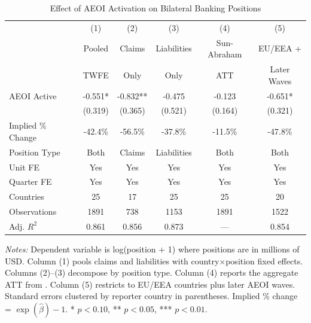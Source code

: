 \begin{table}[t]
\centering
\caption{Effect of AEOI Activation on Bilateral Banking Positions}
\label{tab:main}
\begin{tabular}{lccccc}
\hline\hline
 & (1) & (2) & (3) & (4) & (5) \\
 & Pooled & Claims & Liabilities & Sun-Abraham & EU/EEA + \\
 & TWFE & Only & Only & ATT & Later Waves \\
\hline
AEOI Active & -0.551* & -0.832** & -0.475 & -0.123 & -0.651* \\
 & (0.319) & (0.365) & (0.521) & (0.164) & (0.321) \\
Implied \% Change & -42.4\% & -56.5\% & -37.8\% & -11.5\% & -47.8\% \\
\hline
Position Type & Both & Claims & Liabilities & Both & Both \\
Unit FE & Yes & Yes & Yes & Yes & Yes \\
Quarter FE & Yes & Yes & Yes & Yes & Yes \\
Countries & 25 & 17 & 25 & 25 & 20 \\
Observations & 1891 & 738 & 1153 & 1891 & 1522 \\
Adj. $R^2$ & 0.861 & 0.856 & 0.873 & --- & 0.854 \\
\hline\hline
\end{tabular}
\begin{tablenotes}
\item \textit{Notes:} Dependent variable is log(position $+$ 1) where positions are in millions of USD. Column (1) pools claims and liabilities with country$\times$position fixed effects. Columns (2)--(3) decompose by position type. Column (4) reports the aggregate ATT from \citet{sun2021estimating}. Column (5) restricts to EU/EEA countries plus later AEOI waves. Standard errors clustered by reporter country in parentheses. Implied \% change = $\exp(\hat{\beta}) - 1$. * $p < 0.10$, ** $p < 0.05$, *** $p < 0.01$.
\end{tablenotes}
\end{table}

